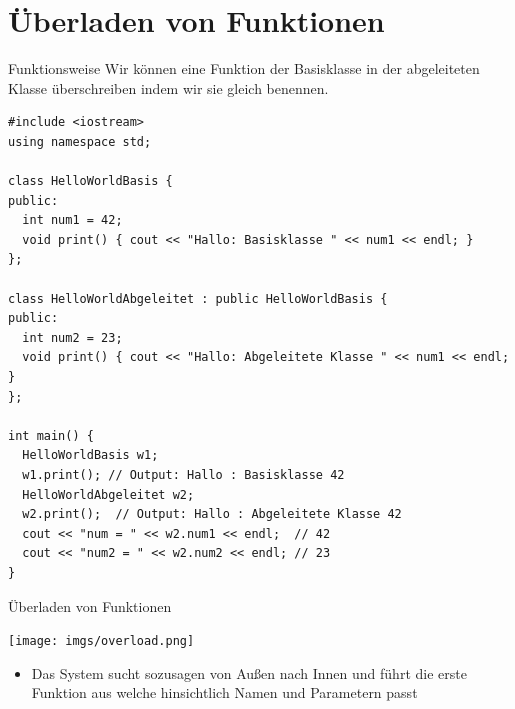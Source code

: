 \documentclass[presentation]{beamer}
\begin{document}
\section{Überladen von Funktionen}
\label{sec:orge90db48}
\begin{frame}[label={sec:org84b6eb8},fragile]{Funktionsweise}
 Wir können eine Funktion der Basisklasse in der abgeleiteten Klasse
überschreiben indem wir sie gleich benennen.
\begin{verbatim}
#include <iostream>
using namespace std;

class HelloWorldBasis {
public:
  int num1 = 42;
  void print() { cout << "Hallo: Basisklasse " << num1 << endl; }
};

class HelloWorldAbgeleitet : public HelloWorldBasis {
public:
  int num2 = 23;
  void print() { cout << "Hallo: Abgeleitete Klasse " << num1 << endl; }
};

int main() {
  HelloWorldBasis w1;
  w1.print(); // Output: Hallo : Basisklasse 42
  HelloWorldAbgeleitet w2;
  w2.print();  // Output: Hallo : Abgeleitete Klasse 42
  cout << "num = " << w2.num1 << endl;  // 42
  cout << "num2 = " << w2.num2 << endl; // 23
}
\end{verbatim}
\end{frame}
\begin{frame}[label={sec:orgb168c3f}]{Überladen von Funktionen}
\begin{center}
\texttt{[image: imgs/overload.png]}
\end{center}
\begin{itemize}
\item Das System sucht sozusagen von \alert{Außen nach Innen} und führt die
erste Funktion aus welche hinsichtlich Namen und Parametern passt
\end{itemize}
\end{frame}
\end{document}
